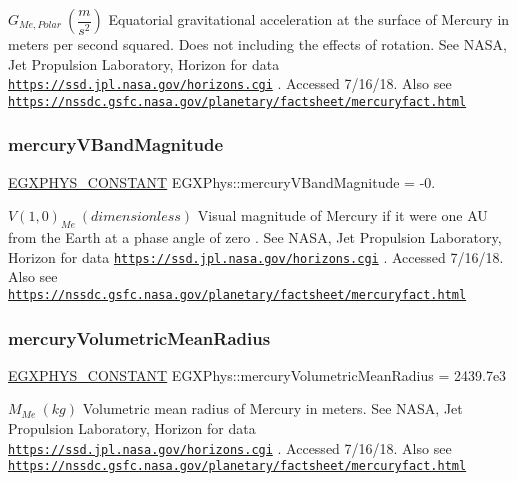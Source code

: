 $ G_{Me,Polar} \ (\dfrac{m}{s^2})$ Equatorial gravitational acceleration at the surface of Mercury in meters per second squared. Does not including the effects of rotation. See N\+A\+SA, Jet Propulsion Laboratory, Horizon for data \href{https://ssd.jpl.nasa.gov/horizons.cgi}{\tt https\+://ssd.\+jpl.\+nasa.\+gov/horizons.\+cgi} . Accessed 7/16/18. Also see \href{https://nssdc.gsfc.nasa.gov/planetary/factsheet/mercuryfact.html}{\tt https\+://nssdc.\+gsfc.\+nasa.\+gov/planetary/factsheet/mercuryfact.\+html} \mbox{\label{group___e_g_x_phys-_constants-_astrophysics-_solar_system-_mercury-_bulk_gab4b0edd36ba34de13b19370f854a8f2c}} 
\subsubsection{\texorpdfstring{mercury\+V\+Band\+Magnitude}{mercuryVBandMagnitude}}
{\footnotesize\ttfamily \mbox{\hyperlink{group___e_g_x_phys-_constants-_macros_ga76980d288494ce1714c9ac68a95ba702}{E\+G\+X\+P\+H\+Y\+S\+\_\+\+C\+O\+N\+S\+T\+A\+NT}} E\+G\+X\+Phys\+::mercury\+V\+Band\+Magnitude = -\/0.}

$ V(1,0)_{Me} \ (dimensionless)$ Visual magnitude of Mercury if it were one AU from the Earth at a phase angle of zero . See N\+A\+SA, Jet Propulsion Laboratory, Horizon for data \href{https://ssd.jpl.nasa.gov/horizons.cgi}{\tt https\+://ssd.\+jpl.\+nasa.\+gov/horizons.\+cgi} . Accessed 7/16/18. Also see \href{https://nssdc.gsfc.nasa.gov/planetary/factsheet/mercuryfact.html}{\tt https\+://nssdc.\+gsfc.\+nasa.\+gov/planetary/factsheet/mercuryfact.\+html} \mbox{\label{group___e_g_x_phys-_constants-_astrophysics-_solar_system-_mercury-_bulk_ga3197bd79c6b461faceffb859933c580f}} 
\subsubsection{\texorpdfstring{mercury\+Volumetric\+Mean\+Radius}{mercuryVolumetricMeanRadius}}
{\footnotesize\ttfamily \mbox{\hyperlink{group___e_g_x_phys-_constants-_macros_ga76980d288494ce1714c9ac68a95ba702}{E\+G\+X\+P\+H\+Y\+S\+\_\+\+C\+O\+N\+S\+T\+A\+NT}} E\+G\+X\+Phys\+::mercury\+Volumetric\+Mean\+Radius = 2439.\+7e3}

$M_{Me} \ (kg)$ Volumetric mean radius of Mercury in meters. See N\+A\+SA, Jet Propulsion Laboratory, Horizon for data \href{https://ssd.jpl.nasa.gov/horizons.cgi}{\tt https\+://ssd.\+jpl.\+nasa.\+gov/horizons.\+cgi} . Accessed 7/16/18. Also see \href{https://nssdc.gsfc.nasa.gov/planetary/factsheet/mercuryfact.html}{\tt https\+://nssdc.\+gsfc.\+nasa.\+gov/planetary/factsheet/mercuryfact.\+html} 